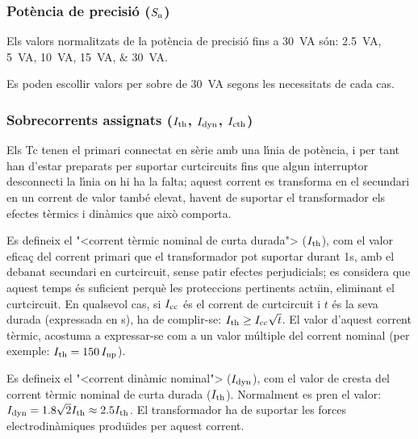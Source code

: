 \subsubsection{Pot\`{e}ncia de precisi\'{o} ($S_\mathrm{n}$)}

 Els valors normalitzats de la pot\`{e}ncia de precisi\'{o} fins a \SI{30}{VA}
s\'{o}n: \SIlist{2,5; 5;10; 15; 30}{VA}.

Es poden escollir valors per sobre de \SI{30}{VA} segons les necessitats de cada cas.

\subsubsection{Sobrecorrents  assignats ($I_\mathrm{th}$, $I_\mathrm{dyn}$, $I_\mathrm{cth}$)}

 Els Tc
tenen el primari connectat en s\`{e}rie amb una l\'{\i}nia de pot\`{e}ncia, i per tant han
d'estar preparats per suportar curtcircuits fins que algun
interruptor desconnecti la l\'{\i}nia on hi ha la falta; aquest
corrent es transforma en el secundari en un corrent de valor
tamb\'{e} elevat, havent de suportar el transformador els efectes t\`{e}rmics
i din\`{a}mics que aix\`{o} comporta.

Es defineix el {"<}corrent t\`{e}rmic nominal de curta durada{">}
($I_\mathrm{th}$), com el valor efica\c{c} del  corrent primari que el
transformador pot suportar durant 1\unit{s}, amb el debanat
secundari en curtcircuit, sense patir efectes perjudicials; es
considera que aquest temps \'{e}s suficient perqu\`{e} les proteccions
pertinents actu\"{\i}n, eliminant el curtcircuit. En qualsevol cas, si
$I_\mathrm{cc}$ \'{e}s el corrent de curtcircuit i $t$ \'{e}s la seva durada
(expressada en s), ha de complir-se: $I_\mathrm{th}\geq
I_\mathrm{cc}\sqrt{t}$. El valor d'aquest corrent t\`{e}rmic,
acostuma a expressar-se com a un valor m\'{u}ltiple del corrent
nominal (per exemple: $I_\mathrm{th}=150\,I_\mathrm{np}$).

Es defineix el {"<}corrent din\`{a}mic nominal{">} ($I_\mathrm{dyn}$), com el
valor de cresta del corrent t\`{e}rmic nominal de curta durada ($I_\mathrm{th}$).
Normalment es pren el valor: $I_\mathrm{dyn} =
\num{1,8}\sqrt{2}I_\mathrm{th}\approx \num{2,5}I_\mathrm{th}$. El transformador ha de
suportar les forces electrodin\`{a}miques produ\"{\i}des per aquest corrent.

